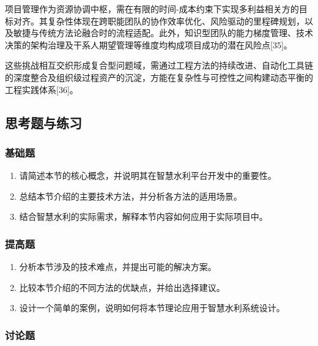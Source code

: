 
项目管理作为资源协调中枢，需在有限的时间-成本约束下实现多利益相关方的目标对齐。其复杂性体现在跨职能团队的协作效率优化、风险驱动的里程碑规划，以及敏捷与传统方法论融合时的流程适配。此外，知识型团队的能力梯度管理、技术决策的架构治理及干系人期望管理等维度均构成项目成功的潜在风险点{[}35{]}。

这些挑战相互交织形成复合型问题域，需通过工程方法的持续改进、自动化工具链的深度整合及组织级过程资产的沉淀，方能在复杂性与可控性之间构建动态平衡的工程实践体系{[}36{]}。

\hypertarget{ux601dux8003ux9898ux4e0eux7ec3ux4e60-1}{%
\subsection{思考题与练习}\label{ux601dux8003ux9898ux4e0eux7ec3ux4e60-1}}

\hypertarget{ux57faux7840ux9898-1}{%
\subsubsection{基础题}\label{ux57faux7840ux9898-1}}

\begin{enumerate}
\def\labelenumi{\arabic{enumi}.}
\tightlist
\item
  请简述本节的核心概念，并说明其在智慧水利平台开发中的重要性。
\item
  总结本节介绍的主要技术方法，并分析各方法的适用场景。
\item
  结合智慧水利的实际需求，解释本节内容如何应用于实际项目中。
\end{enumerate}

\hypertarget{ux63d0ux9ad8ux9898-1}{%
\subsubsection{提高题}\label{ux63d0ux9ad8ux9898-1}}

\begin{enumerate}
\def\labelenumi{\arabic{enumi}.}
\tightlist
\item
  分析本节涉及的技术难点，并提出可能的解决方案。
\item
  比较本节介绍的不同方法的优缺点，并给出选择建议。
\item
  设计一个简单的案例，说明如何将本节理论应用于智慧水利系统设计。
\end{enumerate}

\hypertarget{ux8ba8ux8bbaux9898-1}{%
\subsubsection{讨论题}\label{ux8ba8ux8bbaux9898-1}}

